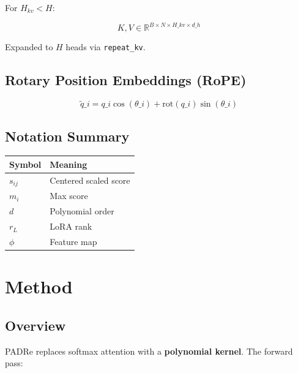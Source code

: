 For $H_{kv} < H$:

\[
K, V \in \mathbb{R}^{B \times N \times H\_{kv} \times d\_h}
\tag{3.11}
\]

Expanded to $H$ heads via \texttt{repeat\_kv}.

\subsection{Rotary Position Embeddings (RoPE)}

\[
\tilde{q}\_i = q\_i \cos(\theta\_i) + \text{rot}(q\_i) \sin(\theta\_i)
\tag{3.12}
\]

\subsection{Notation Summary}

\begin{table}[H]
\centering
\small
\begin{tabular}{ll}
\toprule
\textbf{Symbol} & \textbf{Meaning} \\
\midrule
$s_{ij}$ & Centered scaled score \\
$m_i$ & Max score \\
$d$ & Polynomial order \\
$r_L$ & LoRA rank \\
$\phi$ & Feature map \\
\bottomrule
\end{tabular}
\end{table}



\section{Method}

\subsection{Overview}

PADRe replaces softmax attention with a \textbf{polynomial kernel}. The forward 
pass:

